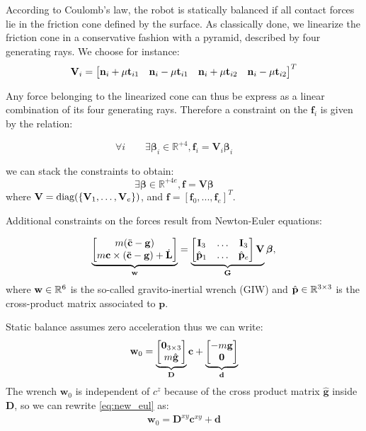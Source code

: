 According to Coulomb's law, the robot is statically balanced if all contact forces lie in the friction cone defined by the surface.
As classically done, we linearize the friction cone in a conservative fashion with a pyramid, described by four generating rays. We choose for instance:
\begin{equation*}
\mathbf{V}_{i} = \begin{bmatrix}\mathbf{n}_{i} + \mu \mathbf{t}_{i1} & \mathbf{n}_{i} -\mu \mathbf{t}_{i1} & \mathbf{n}_{i} + \mu \mathbf{t}_{i2} & \mathbf{n}_{i} - \mu \mathbf{t}_{i2}\end{bmatrix}^T
\end{equation*}

Any force belonging to the linearized cone
can thus be express as a linear combination of its four generating rays.
Therefore a constraint on the $\mathbf{f}_i$ is given by the relation:

\begin{equation*}
\forall i  \qquad  \exists \bm{\beta}_i \in \mathbb{R}^{+4} , \mathbf{f}_{i} = \mathbf{V}_{i} \bm{\beta}_i \qquad 
\end{equation*}

we can stack the constraints to obtain:
\begin{equation}\label{eq:gen}
\exists \bm{\beta} \in \mathbb{R}^{+4e} , \mathbf{f} = \mathbf{V} \bm{\beta} \qquad 
\end{equation}
where $\mathbf{V} = \text{diag}( \{\mathbf{V}_1, \dots, \mathbf{V}_e\} )$, and $\mathbf{f} = [\mathbf{f}_0,...,\mathbf{f}_e]^T$.

Additional constraints on the forces result from Newton-Euler equations:

\begin{align}
\underbrace{\begin{bmatrix}m (\ddot{\mathbf{c}} - \mathbf{g})  \\ m \mathbf{c} \times (\ddot{\mathbf{c}} - \mathbf{g}) + \dot{\mathbf{L}}\end{bmatrix}}_\mathbf{w}
= 
\underbrace{
\begin{bmatrix}\mathbf{I}_3 & \dots & \mathbf{I}_3 \\
\hat{\mathbf{p}}_1 & \dots & \hat{\mathbf{p}}_e\end{bmatrix} \mathbf{V}
}_\mathbf{G}
\bm{\beta},
\end{align}
where $\mathbf{w}\in \mathbb{R}^{6}$ is the so-called gravito-inertial wrench (GIW) \citep{qiu:dhm:2011, Caron2015} and $\hat{\mathbf{p}} \in \mathbb{R}^{3\times 3}$ is the cross-product matrix associated to $\mathbf{p}$.

Static balance assumes zero acceleration thus we can write:
\begin{align} \label{eq:new_eul}
\mathbf{w}_0 = 
\underbrace{\mat{\mathbf{0}_{3\times 3} \\ m \hat{\mathbf{g}}}}_{\mathbf{D}} \mathbf{c} + 
\underbrace{\mat{-m\mathbf{g} \\ \mathbf{0}}}_{\mathbf{d}}
\end{align}
The wrench $\mathbf{w}_0$ is independent of $c^z$ because of the cross product matrix $\hat{\mathbf{g}}$ inside $\mathbf{D}$, so we can rewrite \eqref{eq:new_eul} as:
\begin{align} \label{eq:new_eul2d}
\mathbf{w}_0 = \mathbf{D}^{xy} \mathbf{c}^{xy} + \mathbf{d}
\end{align}

